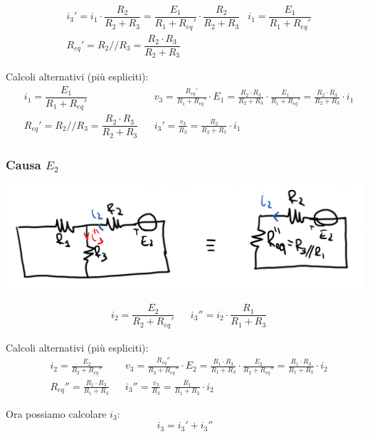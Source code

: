 \documentclass{article}
\begin{document}
\begin{align*}
    &i_3' = i_1 \cdot \dfrac{R_2}{R_2 + R_3} = \dfrac{E_1}{R_1 + R_{eq}'} \cdot \dfrac{R_2}{R_2 + R_3} 
    & i_1 = \dfrac{E_1}{R_1 + R_{eq}'}\\
    &R_{eq}' = R_2 // R_3 = \dfrac{R_2 \cdot R_3}{R_2 + R_3} 
\end{align*}

Calcoli alternativi (più espliciti):
\begin{align*}
    &i_1 = \dfrac{E_1}{R_1 + R_{eq}'} & &v_3= \frac{R_{eq}'}{R_1+R_{eq}'} \cdot E_1 = \frac{R_2 \cdot R_3}{R_2+R_3} \cdot \frac{E_1}{R_1+R_{eq}'} =
    \frac{R_2 \cdot R_3}{R_2+R_3} \cdot i_1 \\
    &R_{eq}' = R_2 // R_3 = \dfrac{R_2 \cdot R_3}{R_2 + R_3} &
    &i_3' = \frac{v_3}{R_3} = \frac{R_2}{R_2+R_3} \cdot i_1
\end{align*}

\subsubsection*{Causa \texorpdfstring{$E_2$}{E2}}
\begin{center}
    \includegraphics[scale=0.25]{Image/Esempio_MetAnalisi_3.png}
\end{center}
\begin{align*}
    &i_2 = \dfrac{E_2}{R_2+R_{eq}'} & &i_3'' = i_2 \cdot \dfrac{R_1}{R_1+R_3}
\end{align*}

Calcoli alternativi (più espliciti):
\begin{align*}
    &i_2=\frac{E_2}{R_2+R_{eq}''} & 
    &v_3 = \frac{R_{eq}''}{R_2+R_{eq}''} \cdot E_2 = \frac{R_1 \cdot R_3}{R_1+R_3} \cdot \frac{E_2}{R_2+R_{eq}''} = \frac{R_1 \cdot R_3}{R_1+R_3} \cdot i_2 \\
    &R_{eq}'' = \frac{R_1 \cdot R_3}{R_1+R_3} &
    &i_3'' = \frac{v_3}{R_3} = \frac{R_1}{R_1+R_3} \cdot i_2 
\end{align*}

Ora possiamo calcolare $i_3$:
\[
    i_3 = i_3' + i_3''
\]
\end{document}
